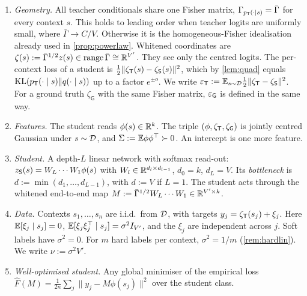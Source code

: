 \begin{definition}\label{def:model}
\begin{enumerate}[label=(\alph*),nosep,leftmargin=*]
\item \emph{Geometry.} All teacher conditionals share one Fisher matrix, $\Gamma_{p_{\mathsf{T}}(\cdot\mid s)}=\bar\Gamma$ for every
context $s$. This holds to leading order when teacher logits are uniformly small, where
$\bar\Gamma\to C/V$. Otherwise it is the homogeneous-Fisher idealisation already used in
\cref{prop:powerlaw}. Whitened coordinates are $\zeta(s):=\bar\Gamma^{1/2}z(s)\in\operatorname{range}\bar\Gamma\cong\mathbb{R}^{V'}$.
They see only the centred logits. The per-context loss of a student is $\frac12\|\zeta_{\mathsf{T}}(s)-\zeta_{\mathsf{S}}(s)\|^2$,
which by \cref{lem:quad} equals $\mathrm{KL}(p_{\mathsf{T}}(\cdot\mid s)\|q(\cdot\mid s))$ up to a factor $e^{\pm o}$. We write
$\varepsilon_{\mathsf{T}}:=\mathbb{E}_{s\sim\mathcal{D}}\frac12\|\zeta_{\mathsf{T}}-\zeta_{\mathsf{S}}\|^2$. For a ground truth $\zeta_{\mathsf G}$ with the same Fisher matrix,
$\varepsilon_{\mathsf G}$ is defined in the same way.
\item \emph{Features.} The student reads $\phi(s)\in\mathbb{R}^k$. The triple $(\phi,\zeta_{\mathsf{T}},\zeta_{\mathsf G})$ is jointly
centred Gaussian under $s\sim\mathcal{D}$, and $\Sigma:=\mathbb{E}\phi\phi^\top\succ0$. An intercept is one more feature.
\item \emph{Student.} A depth-$L$ linear network with softmax read-out: $z_{\mathsf{S}}(s)=W_L\cdots W_1\phi(s)$ with
$W_l\in\mathbb{R}^{d_l\times d_{l-1}}$, $d_0=k$, $d_L=V$. Its \emph{bottleneck} is $d:=\min(d_1,\dots,d_{L-1})$, with $d:=V$ if
$L=1$. The student acts through the whitened end-to-end map $M:=\bar\Gamma^{1/2}W_L\cdots W_1\in\mathbb{R}^{V'\times k}$.
\item \emph{Data.} Contexts $s_1,\dots,s_n$ are i.i.d.\ from $\mathcal{D}$, with targets $y_j=\zeta_{\mathsf{T}}(s_j)+\xi_j$.
Here $\mathbb{E}[\xi_j\mid s_j]=0$, $\mathbb{E}[\xi_j\xi_j^\top\mid s_j]=\sigma^2I_{V'}$, and the $\xi_j$ are independent across $j$. Soft labels
have $\sigma^2=0$. For $m$ hard labels per context, $\sigma^2=1/m$ (\cref{rem:hardlin}). We write $\nu:=\sigma^2V'$.
\item \emph{Well-optimised student.} Any global minimiser of the empirical loss
$\hat F(M)=\frac1{2n}\sum_j\|y_j-M\phi(s_j)\|^2$ over the student class.
\end{enumerate}
\end{definition}


